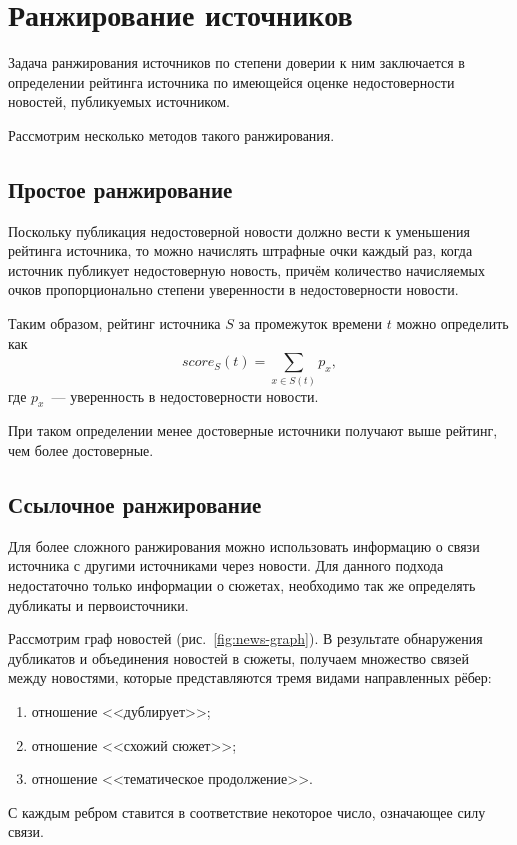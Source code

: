 \section{Ранжирование источников}
Задача ранжирования источников по степени доверии к ним заключается в определении рейтинга источника по имеющейся оценке недостоверности новостей, публикуемых источником.

Рассмотрим несколько методов такого ранжирования.

\subsection{Простое ранжирование} \label{ssec:simple-ranking}
Поскольку публикация недостоверной новости должно вести к уменьшения рейтинга источника, то можно начислять штрафные очки каждый раз, когда источник публикует недостоверную новость, причём количество начисляемых очков пропорционально степени уверенности в недостоверности новости.

Таким образом, рейтинг источника $S$ за промежуток времени $t$ можно определить как
\begin{equation}
    score_S(t)=\sum_{x\in S(t)} p_x,
\end{equation}
где $p_x$~--- уверенность в недостоверности новости.

При таком определении менее достоверные источники получают выше рейтинг, чем более достоверные.

\subsection{Ссылочное ранжирование}
Для более сложного ранжирования можно использовать информацию о связи источника с другими источниками через новости. Для данного подхода недостаточно только информации о сюжетах, необходимо так же определять дубликаты и первоисточники.

Рассмотрим граф новостей (рис.~\ref{fig:news-graph}). В результате обнаружения дубликатов и объединения новостей в сюжеты, получаем множество связей между новостями, которые представляются тремя видами направленных рёбер:
\begin{enumerate}
    \item отношение <<дублирует>>;
    \item отношение <<схожий сюжет>>;
    \item отношение <<тематическое продолжение>>.
\end{enumerate}

С каждым ребром ставится в соответствие некоторое число, означающее силу связи.


